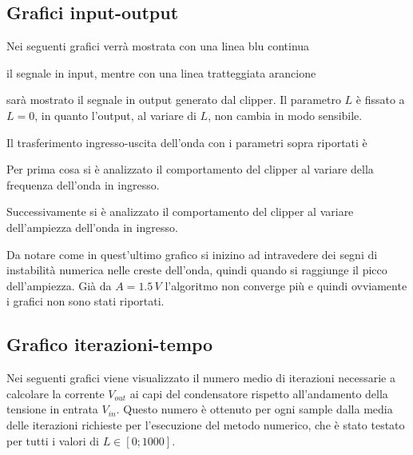 		\subsection{Grafici input-output}
			\label{graphs:input-output}
			Nei seguenti grafici verrà mostrata con una linea blu continua
			il segnale in \textcolor{matlab_blue}{input}, mentre con una linea tratteggiata arancione
			sarà mostrato il segnale in \textcolor{matlab_orange}{output} generato dal clipper. Il parametro $L$ è fissato a $L = 0$, in quanto l'output, al variare di $L$, non cambia in modo sensibile.
		
			Il trasferimento ingresso-uscita dell'onda con i parametri sopra riportati è
			\pagebreak
		
			Per prima cosa si è analizzato il comportamento del clipper al variare della frequenza dell'onda in ingresso.
			\graficospace
			\graficospace
			\pagebreak
		
			Successivamente si è analizzato il comportamento del clipper al variare dell'ampiezza dell'onda in ingresso.
			\graficospace
			\graficospace
			
			Da notare come in quest'ultimo grafico si inizino ad intravedere dei segni di instabilità numerica nelle creste dell'onda, quindi quando si raggiunge il picco dell'ampiezza. Già da $A = 1.5\,V$ l'algoritmo non converge più e quindi ovviamente i grafici non sono stati riportati.
			\pagebreak
		
		\subsection{Grafico iterazioni-tempo}
			\label{graphs:iterazioni-tempo}
			Nei seguenti grafici viene visualizzato il numero medio di iterazioni necessarie a calcolare la corrente $V_{out}$ ai capi del condensatore rispetto all'andamento della tensione in entrata $V_{in}$. Questo numero è ottenuto per ogni sample dalla media delle iterazioni richieste per l'esecuzione del metodo numerico, che è stato testato per tutti i valori di $L \in [0; 1000]$. 

